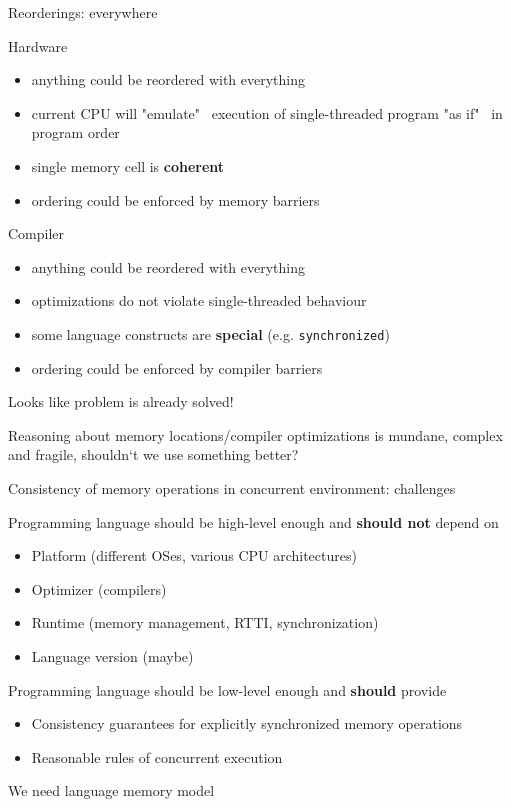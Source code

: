 \begin{frame}{Reorderings: everywhere}

Hardware
\begin{itemize}
  \pause \item anything could be reordered with everything
  \pause \item current CPU will "emulate" \ execution of single-threaded program "as if" \ in program order
  \pause \item single memory cell is \textbf{coherent} 
  \pause \item ordering could be enforced by memory barriers
\end{itemize}

\pause
Compiler
\begin{itemize}
  \pause \item anything could be reordered with everything
  \pause \item optimizations do not violate single-threaded behaviour   
  \pause \item some language constructs are \textbf{special} (e.g. \texttt{synchronized})
  \pause \item ordering could be enforced by compiler barriers
\end{itemize}

\pause
Looks like problem is already solved!

\pause

Reasoning about memory locations/compiler optimizations is mundane, complex and fragile, shouldn`t we use something better?

\end{frame}




\begin{frame}{Consistency of memory operations in concurrent environment: challenges}

Programming language should be high-level enough and \textbf{should not} depend on
\begin{itemize}
  \pause \item Platform (different OSes, various CPU architectures)
  \pause \item Optimizer (compilers)
  \pause \item Runtime (memory management, RTTI, synchronization)
  \pause \item Language version (maybe)
\end{itemize}

\pause 
Programming language should be low-level enough and \textbf{should} provide
\begin{itemize}
  \pause \item Consistency guarantees for explicitly synchronized memory operations
  \pause \item Reasonable rules of concurrent execution  
\end{itemize}

\pause

We need language memory model

\end{frame}


